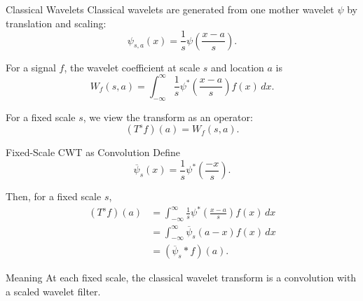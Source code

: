 \documentclass[aspectratio=1610,xcolor=dvipsnames,t]{beamer}
\begin{document}
\begin{frame}{Classical Wavelets}
Classical wavelets are generated from one mother wavelet $\psi$ by translation and scaling:
\[
\psi_{s,a}(x)
=
\frac{1}{s}\psi\left(\frac{x-a}{s}\right).
\tag{SGWT Eq. 1}
\]

For a signal $f$, the wavelet coefficient at scale $s$ and location $a$ is
\[
W_f(s,a)
=
\int_{-\infty}^{\infty}
\frac{1}{s}
\psi^*\left(\frac{x-a}{s}\right)
f(x)\,dx.
\tag{SGWT Eq. 2}
\]

For a fixed scale $s$, we view the transform as an operator:
\[
(T^s f)(a)=W_f(s,a).
\]
\end{frame}

\begin{frame}{Fixed-Scale CWT as Convolution}
Define
\[
\overline{\psi}_s(x)
=
\frac{1}{s}
\psi^*\left(\frac{-x}{s}\right).
\tag{SGWT Eq. 5}
\]

Then, for a fixed scale $s$,
\[
\begin{aligned}
(T^s f)(a)
&=
\int_{-\infty}^{\infty}
\frac{1}{s}
\psi^*\left(\frac{x-a}{s}\right)
f(x)\,dx \\
&=
\int_{-\infty}^{\infty}
\overline{\psi}_s(a-x)f(x)\,dx \\
&=
(\overline{\psi}_s*f)(a).
\end{aligned}
\tag{SGWT Eq. 6}
\]

\begin{block}{Meaning}
At each fixed scale, the classical wavelet transform is a convolution with a scaled wavelet filter.
\end{block}
\end{frame}
\end{document}
